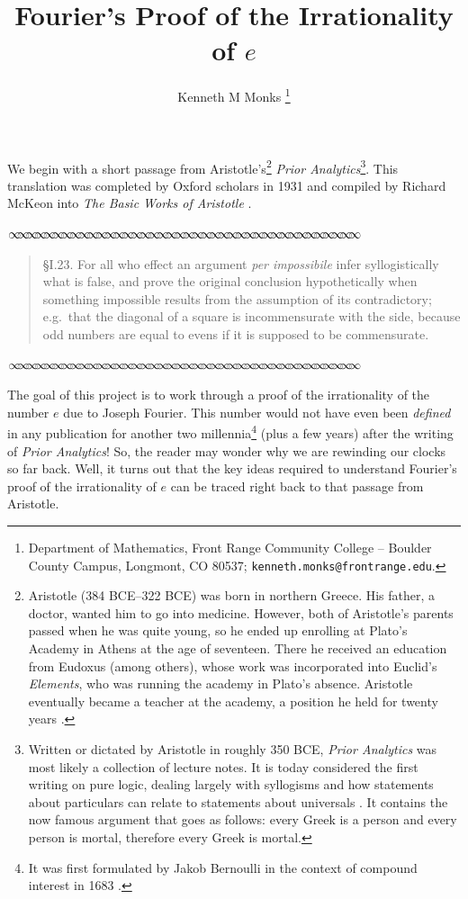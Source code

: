 \documentclass[11pt]{article}
\newcommand{\sep}{\vspace{-3pt}
\begin{center}
{\mathversion{normal}
$\infty \mspace{-5.5mu}\infty \mspace{-5.5mu}\infty \mspace{-5.5mu}\infty \mspace{-5.5mu}
\infty \mspace{-5.5mu}\infty \mspace{-5.5mu}\infty \mspace{-5.5mu}\infty \mspace{-5.5mu}
\infty \mspace{-5.5mu}\infty \mspace{-5.5mu}\infty \mspace{-5.5mu}\infty \mspace{-5.5mu}
\infty \mspace{-5.5mu}\infty \mspace{-5.5mu}\infty \mspace{-5.5mu}\infty \mspace{-5.5mu}
\infty \mspace{-5.5mu}\infty \mspace{-5.5mu}\infty \mspace{-5.5mu}\infty \mspace{-5.5mu}
\infty \mspace{-5.5mu}\infty \mspace{-5.5mu}\infty \mspace{-5.5mu}\infty \mspace{-5.5mu}
\infty \mspace{-5.5mu}\infty \mspace{-5.5mu}\infty \mspace{-5.5mu}\infty \mspace{-5.5mu}
\infty \mspace{-5.5mu}\infty \mspace{-5.5mu}\infty \mspace{-5.5mu}\infty \mspace{-5.5mu}
\infty \mspace{-5.5mu}\infty \mspace{-5.5mu}\infty \mspace{-5.5mu}\infty \mspace{-5.5mu}
\infty \mspace{-5.5mu}\infty \mspace{-5.5mu}\infty \mspace{-5.5mu}\infty \mspace{-5.5mu}$}
\end{center} \vspace*{-5pt}}
\newenvironment{source}%
 {\bigskip \sep \vspace*{-6pt} \begin{quote}
          \begin{sf}   }
   {   \end{sf}     \end{quote} \vspace*{-6pt} \sep \bigskip}%
\begin{document}
\title{Fourier's Proof of the Irrationality of $e$}
\author{Kenneth M Monks \thanks{Department of Mathematics, Front Range Community College -- Boulder County Campus, Longmont, CO 80537; \texttt{kenneth.monks@frontrange.edu}.
}}
\bigskip


\maketitle

\vspace*{-10pt}

We begin with a short passage from Aristotle's\footnote{Aristotle (384 BCE--322 BCE) was born in northern Greece.  His father, a doctor, wanted him to go into medicine.  However, both of Aristotle's parents passed when he was quite young, so he ended up enrolling at Plato's Academy in Athens at the age of seventeen.  There he received an education from Eudoxus (among others), whose work was incorporated into Euclid's \emph{Elements}, who was running the academy in Plato's absence. Aristotle eventually became a teacher at the academy, a position he held for twenty years \citep{StAndrewsAristotle}.} \emph{Prior Analytics}\footnote{Written or dictated by Aristotle in roughly 350 BCE, \emph{Prior Analytics} was most likely a collection of lecture notes.  It is today considered the first writing on pure logic, dealing largely with syllogisms and how statements about particulars can relate to statements about universals \citep{Aristotle}. It contains the now famous argument that goes as follows: every Greek is a person and every person is mortal, therefore every Greek is mortal.}. This translation was completed by Oxford scholars in 1931 and compiled by Richard McKeon into \emph{The Basic Works of Aristotle} \citep{Aristotle}.

\begin{source}
\S I.23.  For all who effect an argument \emph{per impossibile} infer syllogistically what is false, and prove the original conclusion hypothetically when something impossible results from the assumption of its contradictory; e.g.\ that the diagonal of a square is incommensurate with the side, because odd numbers are equal to evens if it is supposed to be commensurate.
\end{source}

The goal of this project is to work through a proof of the irrationality of the number $e$ due to Joseph Fourier.  This number would not have even been \emph{defined} in any publication for another two millennia\footnote{It was first formulated by Jakob Bernoulli in the context of compound interest in 1683 \citep{DSB}.} (plus a few years) after the writing of \emph{Prior Analytics}!  So, the reader may wonder why we are rewinding our clocks so far back.  Well, it turns out that the  key ideas required to understand Fourier's proof of the irrationality of $e$ can be traced right back to that passage from Aristotle. 
\end{document}
